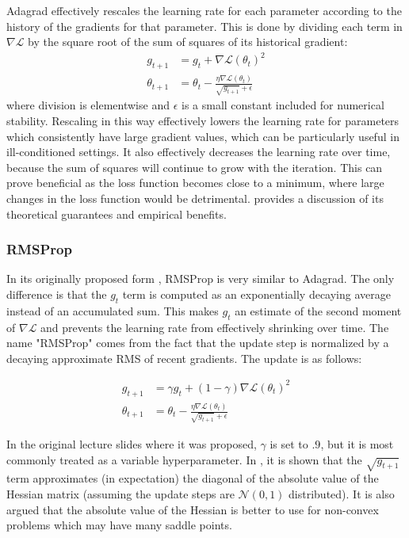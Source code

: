 Adagrad \cite{} effectively rescales the learning rate for each parameter according to the history of the gradients for that parameter.
This is done by dividing each term in $\nabla \mathcal{L}$ by the square root of the sum of squares of its historical gradient:
\begin{align}
g_{t + 1} &= g_t + \nabla \mathcal{L}(\theta_t)^2 \\
\theta_{t + 1} &= \theta_t - \frac{\eta\nabla \mathcal{L}(\theta_t)}{\sqrt{g_{t + 1}} + \epsilon}
\end{align}
where division is elementwise and $\epsilon$ is a small constant included for numerical stability.
Rescaling in this way effectively lowers the learning rate for parameters which consistently have large gradient values, which can be particularly useful in ill-conditioned settings.
It also effectively decreases the learning rate over time, because the sum of squares will continue to grow with the iteration.
This can prove beneficial as the loss function becomes close to a minimum, where large changes in the loss function would be detrimental.
\cite{} provides a discussion of its theoretical guarantees and empirical benefits.

\subsubsection{RMSProp}

In its originally proposed form \cite{}, RMSProp is very similar to Adagrad.
The only difference is that the $g_t$ term is computed as an exponentially decaying average instead of an accumulated sum.
This makes $g_t$ an estimate of the second moment of $\nabla \mathcal{L}$ and prevents the learning rate from effectively shrinking over time.
The name "RMSProp" comes from the fact that the update step is normalized by a decaying approximate RMS of recent gradients.
The update is as follows:

\begin{align}
g_{t + 1} &= \gamma g_t + (1 - \gamma) \nabla \mathcal{L}(\theta_t)^2 \\
\theta_{t + 1} &= \theta_t - \frac{\eta\nabla \mathcal{L}(\theta_t)}{\sqrt{g_{t + 1}} + \epsilon}
\end{align}

In the original lecture slides where it was proposed, $\gamma$ is set to $.9$, but it is most commonly treated as a variable hyperparameter.
In \cite{}, it is shown that the $\sqrt{g_{t + 1}}$ term approximates (in expectation) the diagonal of the absolute value of the Hessian matrix (assuming the update steps are $\mathcal{N}(0, 1)$ distributed).
It is also argued that the absolute value of the Hessian is better to use for non-convex problems which may have many saddle points.

